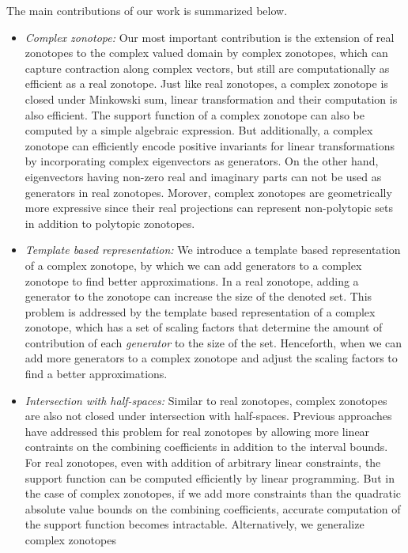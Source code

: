 The main contributions of our work is summarized below.
%
\begin{itemize}
\item \emph{Complex zonotope: } Our most important contribution is the
  extension of real zonotopes to the complex valued domain by
  complex zonotopes, which can capture contraction along complex
  vectors, but still are computationally as efficient as a real
  zonotope.  Just like real zonotopes, a complex zonotope is closed
  under Minkowski sum, linear transformation and their computation is
  also efficient.  The support function of a complex zonotope can also
  be computed by a simple algebraic expression.  But additionally, a
  complex zonotope can efficiently encode positive invariants for
  linear transformations by incorporating complex eigenvectors as
  generators.  On the other hand, eigenvectors having non-zero real
  and imaginary parts can not be used as generators in real zonotopes.
  Morover, complex zonotopes are geometrically more expressive since
  their real projections can represent non-polytopic sets in addition
  to polytopic zonotopes.
\item \emph{Template based representation: } We introduce a template
  based representation of a complex zonotope, by which we can add
  generators to a complex zonotope to find better approximations.  In
  a real zonotope, adding a generator to the zonotope can increase the
  size of the denoted set.  This problem is addressed by the template
  based representation of a complex zonotope, which has a set of
  scaling factors that determine the amount of contribution of each
  \emph{generator} to the size of the set.  Henceforth, when we can
  add more generators to a complex zonotope and adjust the scaling
  factors to find a better approximations.
\item \emph{Intersection with half-spaces: } Similar to real
  zonotopes, complex zonotopes are also not closed under intersection
  with half-spaces.  Previous
  approaches~\cite{scott2016constrained,Ghorbal2010} have addressed
  this problem for real zonotopes by allowing more linear contraints
  on the combining coefficients in addition to the interval bounds.
  For real zonotopes, even with addition of arbitrary linear
  constraints, the support function can be computed efficiently by
  linear programming.  But in the case of complex zonotopes, if we add
  more constraints than the quadratic absolute value bounds on the
  combining coefficients, accurate computation of the support function
  becomes intractable.  Alternatively, we generalize complex zonotopes

\end{itemize}

